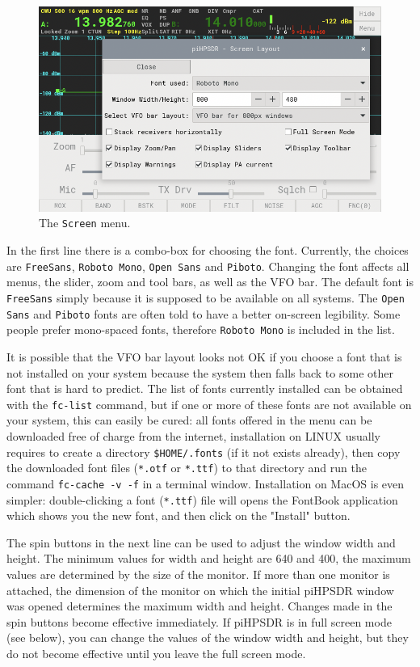 \documentclass[12pt]{book}
\def\rett#1{\texttt{\color{red}#1}}
\def\bltt#1{\texttt{\color{blue}#1}}
\def\pH{pi\-HPSDR\xspace}
\begin{document}
\begin{figure}[ht]
\center
\includegraphics[scale=0.45]{ScreenMenu.png}
\caption{The \bltt{Screen} menu.}
\label{fig:ScreenMenu}
\end{figure}

In the first line there is a combo-box for choosing the font. Currently, the choices
are \rett{FreeSans}, \rett{Roboto Mono}, \rett{Open Sans} and \rett{Piboto}. Changing
the font affects all menus, the slider, zoom and tool bars, as well as the VFO bar.
The default font is \rett{FreeSans} simply because it is supposed to be available on all
systems. The \rett{Open Sans} and \rett{Piboto} fonts are often told to have a
better on-screen legibility. Some people prefer mono-spaced fonts, therefore \rett{Roboto Mono}
is included in the list.

It is possible that the VFO bar layout looks not OK if you choose a font
that is not installed on your system because the system then falls back to some
other font that is hard to predict. The list of fonts currently installed can be
obtained with the \texttt{fc-list} command, but
if one or more of these fonts are not available on your system, this can easily be
cured: all fonts offered in the menu can be downloaded
free of charge from the internet, installation on LINUX usually requires to create
a directory \texttt{\$HOME/.fonts} (if it not exists already), then copy the downloaded
font files (\texttt{*.otf} or \texttt{*.ttf}) to that directory and run the command
\texttt{fc-cache -v -f} in a terminal window. Installation on MacOS is even simpler:
double-clicking a font  (\texttt{*.ttf}) file will opens the FontBook application
which shows you the new font, and then click on the "Install" button.

The spin buttons in the next line can be used to adjust the window width and height.
The minimum values for width and height are 640 and 400, the maximum values are determined by
the size of the monitor. If more than one monitor is attached, the dimension
of the monitor on which the initial \pH window was opened determines
the maximum width and height. Changes made in the spin buttons become effective
immediately. If \pH is in full screen mode (see below), you can change the
values of the window width and height, but they do not become effective until
you leave the full screen mode.
\end{document}
